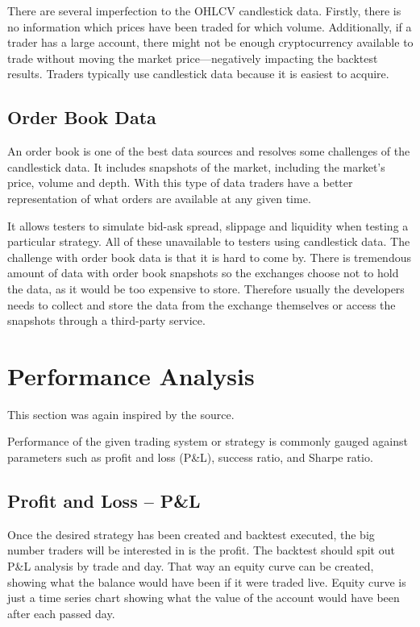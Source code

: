 There are several imperfection to the OHLCV candlestick data. Firstly, there is no information which prices have been traded for which volume. Additionally, if a trader has a large account, there might not be enough cryptocurrency available to trade without moving the market price---negatively impacting the backtest results. Traders typically use candlestick data because it is easiest to acquire.

\subsection*{Order Book Data}
An order book is one of the best data sources and resolves some challenges of the candlestick data. It includes snapshots of the market, including the market's price, volume and depth. With this type of data traders have a better representation of what orders are available at any given time.

It allows testers to simulate bid-ask spread, slippage and liquidity when testing a particular strategy. All of these unavailable to testers using candlestick data. The challenge with order book data is that it is hard to come by. There is tremendous amount of data with order book snapshots so the exchanges choose not to hold the data, as it would be too expensive to store. Therefore usually the developers needs to collect and store the data from the exchange themselves or access the snapshots through a third-party service.

\section{Performance Analysis}
\label{performance-analysis}
This section was again inspired by the \cite{backtesting-crypto-trading-strategies} source.

Performance of the given trading system or strategy is commonly gauged against parameters such as profit and loss (P\&L), success ratio, and Sharpe ratio. 

\subsection*{Profit and Loss -- P\&L}
Once the desired strategy has been created and backtest executed, the big number traders will be interested in is the profit. The backtest should spit out P\&L analysis by trade and day. That way an equity curve can be created, showing what the balance would have been if it were traded live. Equity curve is just a time series chart showing what the value of the account would have been after each passed day.

